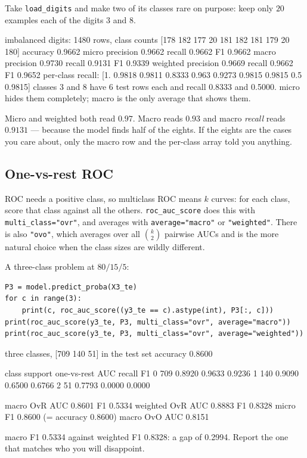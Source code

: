 \documentclass[11pt]{article}
\begin{document}
Take \texttt{load\_digits} and make two of its classes rare on purpose: keep only
$20$ examples each of the digits $3$ and $8$.

\begin{codeout}
imbalanced digits: 1480 rows, class counts [178 182 177  20 181 182 181 179  20 180]
accuracy 0.9662
  micro     precision 0.9662  recall 0.9662  F1 0.9662
  macro     precision 0.9730  recall 0.9131  F1 0.9339
  weighted  precision 0.9669  recall 0.9662  F1 0.9652
per-class recall: [1.     0.9818 0.9811 0.8333 0.963  0.9273 0.9815 0.9815 0.5    0.9815]
classes 3 and 8 have 6 test rows each and recall 0.8333 and 0.5000.
micro hides them completely; macro is the only average that shows them.
\end{codeout}

Micro and weighted both read $0.97$. Macro reads $0.93$ and macro \emph{recall}
reads $0.9131$ --- because the model finds half of the eights. If the
eights are the cases you care about, only the macro row and the per-class array
told you anything.

\subsection{One-vs-rest ROC}

ROC needs a positive class, so multiclass ROC means $k$ curves: for each class,
score that class against all the others. \texttt{roc\_auc\_score} does this with
\texttt{multi\_class="ovr"}, and averages with \texttt{average="macro"} or
\texttt{"weighted"}. There is also \texttt{"ovo"}, which averages over all
$\binom{k}{2}$ pairwise AUCs and is the more natural choice when the class sizes
are wildly different.

A three-class problem at $80 / 15 / 5$:

\begin{lstlisting}
P3 = model.predict_proba(X3_te)
for c in range(3):
    print(c, roc_auc_score((y3_te == c).astype(int), P3[:, c]))
print(roc_auc_score(y3_te, P3, multi_class="ovr", average="macro"))
print(roc_auc_score(y3_te, P3, multi_class="ovr", average="weighted"))
\end{lstlisting}
\begin{codeout}
three classes, [709 140  51] in the test set
accuracy 0.8600

class  support   one-vs-rest AUC   recall      F1
  0        709          0.8920     0.9633  0.9236
  1        140          0.9090     0.6500  0.6766
  2         51          0.7793     0.0000  0.0000

macro    OvR AUC 0.8601   F1 0.5334
weighted OvR AUC 0.8883   F1 0.8328
micro                       F1 0.8600 (= accuracy 0.8600)
macro OvO AUC 0.8151

macro F1 0.5334 against weighted F1 0.8328: a gap of 0.2994.
Report the one that matches who you will disappoint.
\end{codeout}
\end{document}
